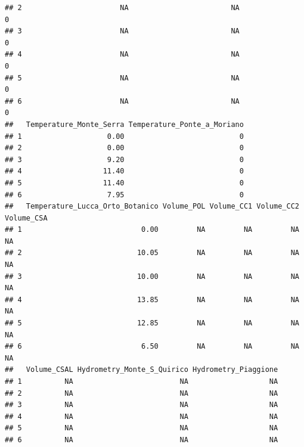 \documentclass[
]{article}
\begin{document}
\begin{verbatim}
## 2                       NA                        NA                    0
## 3                       NA                        NA                    0
## 4                       NA                        NA                    0
## 5                       NA                        NA                    0
## 6                       NA                        NA                    0
##   Temperature_Monte_Serra Temperature_Ponte_a_Moriano
## 1                    0.00                           0
## 2                    0.00                           0
## 3                    9.20                           0
## 4                   11.40                           0
## 5                   11.40                           0
## 6                    7.95                           0
##   Temperature_Lucca_Orto_Botanico Volume_POL Volume_CC1 Volume_CC2 Volume_CSA
## 1                            0.00         NA         NA         NA         NA
## 2                           10.05         NA         NA         NA         NA
## 3                           10.00         NA         NA         NA         NA
## 4                           13.85         NA         NA         NA         NA
## 5                           12.85         NA         NA         NA         NA
## 6                            6.50         NA         NA         NA         NA
##   Volume_CSAL Hydrometry_Monte_S_Quirico Hydrometry_Piaggione
## 1          NA                         NA                   NA
## 2          NA                         NA                   NA
## 3          NA                         NA                   NA
## 4          NA                         NA                   NA
## 5          NA                         NA                   NA
## 6          NA                         NA                   NA
\end{verbatim}
\end{document}
